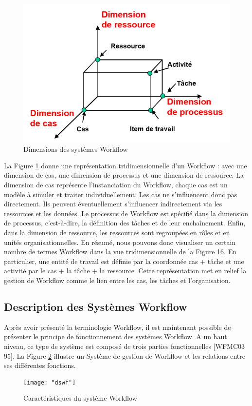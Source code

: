  	 
\begin{figure}[h]
	\centering
	\includegraphics[width=0.5\linewidth]{images/DimensionsWF}
	\caption{ Dimensions des systèmes Workflow }
	\label{fig:dimensionswf}
\end{figure}
 	 La Figure \ref{fig:dimensionswf} donne une représentation tridimensionnelle d’un Workflow : avec une dimension de cas, une dimension de processus et une dimension de ressource. La dimension de cas représente l’instanciation du Workflow, chaque cas est un modèle à simuler et traiter individuellement. Les cas ne s’influencent donc pas directement. Ils peuvent éventuellement s’influencer indirectement via les ressources et les données. Le processus de Workflow est spécifié dans la dimension de processus, c’est-à-dire, la définition des tâches et de leur enchaînement. Enfin, dans la dimension de ressource, les ressources sont regroupées en rôles et en unités organisationnelles. En résumé, nous pouvons donc visualiser un certain nombre de termes Workflow dans la vue tridimensionnelle de la Figure 16. En particulier, une entité de travail est définie par la coordonnée cas + tâche et une activité par le cas + la tâche + la ressource. Cette représentation met en relief la gestion de Workflow comme le lien entre les cas, les tâches et l’organisation. 
 	 
 	 \subsection{Description des Systèmes Workflow }
 	 Après avoir présenté la terminologie Workflow, il est maintenant possible de présenter le principe de fonctionnement des systèmes Workflow. A un haut niveau, ce type de système est composé de trois parties fonctionnelles [WFMC03 95]. La Figure \ref{fig:dswf} illustre un Système de gestion de Workflow et les relations entre ses différentes fonctions. 
 	 
 	 
 	 
 
\begin{figure}[H]
	\centering
	\texttt{[image: "dswf"]}
 
	\caption{Caractéristiques du système Workflow}
	\label{fig:dswf}
\end{figure}
